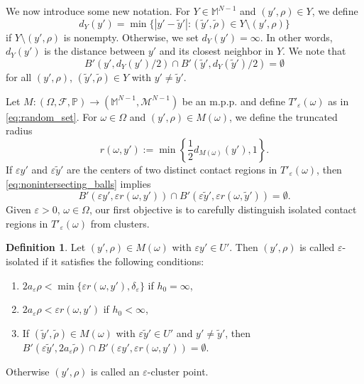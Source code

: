 \documentclass{article}
\numberwithin{equation}{section}
\theoremstyle{definition}
\newtheorem{definition}[theorem]{Definition}
\theoremstyle{remark}
\begin{document}
We now introduce some new notation. For $Y \in \mathbb{M}^{N - 1}$ and $(y', \rho) \in Y$, we define
\begin{equation} \label{eq:distance_to_closest_neighbor}
    d_Y(y') = \min \{|y' - \tilde{y}'| :  (\tilde{y}', \tilde{\rho}) \in Y \setminus (y', \rho) \}
\end{equation}
if $Y \setminus (y', \rho)$ is nonempty. Otherwise, we set $d_Y(y') = \infty$. In other words, $d_Y(y')$ is the distance between $y'$ and its closest neighbor in $Y$. We note that 
\begin{equation} \label{eq:nonintersecting_balls}
    B'(y', d_Y(y')/2) \cap B'(\tilde{y}', d_Y(\tilde{y}')/2) = \emptyset
\end{equation}
for all $(y', \rho)$, $(\tilde{y}', \tilde{\rho}) \in Y$ with $y' \neq \tilde{y}'$.

Let $M :(\Omega, \mathcal{F}, \mathbb{P}) \rightarrow (\mathbb{M}^{N - 1}, \mathcal{M}^{N - 1})$ be an m.p.p.\!\! and define $T'_\varepsilon(\omega)$ as in \eqref{eq:random_set}. For $\omega \in \Omega$ and $(y', \rho) \in M(\omega)$, we define the truncated radius
\[
r(\omega, y') := \min \left\{\frac{1}{2}d_{M(\omega)}(y'), 1\right\}.
\]
If $\varepsilon y'$ and $\varepsilon \tilde{y}'$ are the centers of two distinct contact regions in $T'_\varepsilon(\omega)$, then \eqref{eq:nonintersecting_balls} implies
\begin{equation} \label{eq:nonintersecting_scaled_balls}
    B'(\varepsilon y', \varepsilon r(\omega, y')) \cap B'(\varepsilon \tilde{y}', \varepsilon r(\omega, \tilde{y}')) = \emptyset.
\end{equation}
Given $\varepsilon > 0$, $\omega \in \Omega$, our first objective is to carefully distinguish isolated contact regions in $T'_\varepsilon(\omega)$ from clusters.


\begin{definition} \label{def:isolated_and_cluster_points}
    Let $(y', \rho) \in M(\omega)$ with $\varepsilon y' \in U'$. Then $(y', \rho)$ is called $\varepsilon$-isolated if it satisfies the following conditions:
    \begin{enumerate}
        \item[(1a)] $2 a_\varepsilon\rho < \min \{\varepsilon r(\omega, y'), \delta_\varepsilon\}$ if $h_0 = \infty$,
        \item[(1b)] $2 a_\varepsilon\rho < \varepsilon r(\omega, y')$ if $h_0 < \infty$,
        \item[(2)] If $(\tilde{y}', \tilde{\rho}) \in M(\omega)$ with $\varepsilon \tilde{y}' \in U'$ and $y' \neq \tilde{y}'$, then $B'(\varepsilon \tilde{y}', 2 a_\varepsilon \tilde{\rho}) \cap B'(\varepsilon y', \varepsilon r(\omega, y')) = \emptyset$.
    \end{enumerate}
    Otherwise $(y', \rho)$ is called an $\varepsilon$-cluster point.
\end{definition}
\end{document}
